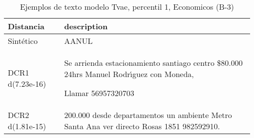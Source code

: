 \begin{table}[H]
\centering
\fontsize{10}{14}\selectfont
\caption{Ejemplos de texto modelo Tvae, percentil 1, Economicos (B-3)}
\label{table-example-economicos-b-3-tvae-1p-text}
\begin{tabular}{|l|m{35em}|}
\hline
\rowcolor[gray]{0.8}
Distancia & description \\
\hline Sintético & AANUL \\
\hline DCR1 d(7.23e-16) & Se arrienda estacionamiento santiago centro \$80.000  24hrs 
Manuel Rodr{\'\i}guez  con Moneda, 

Llamar 56957320703 \\
\hline DCR2 d(1.81e-15) & 200.000 desde departamentos un ambiente Metro Santa Ana ver directo Rosas 1851 982592910. \\
\hline
\end{tabular}
\end{table}
